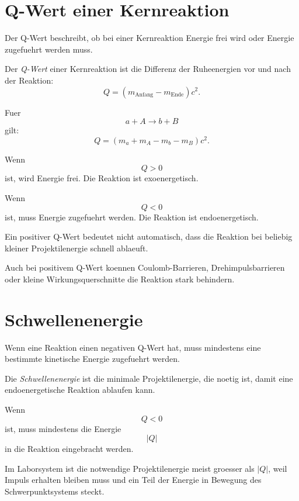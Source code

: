 \section{Q-Wert einer Kernreaktion}

Der Q-Wert beschreibt, ob bei einer Kernreaktion Energie frei wird oder Energie
zugefuehrt werden muss.

\begin{definitionbox}
Der \emph{Q-Wert} einer Kernreaktion ist die Differenz der Ruheenergien vor und
nach der Reaktion:
\[
    Q =
    \left(
        m_{\mathrm{Anfang}} - m_{\mathrm{Ende}}
    \right)c^2.
\]
\end{definitionbox}

\begin{formulabox}
Fuer
\[
    a + A \rightarrow b + B
\]
gilt:
\[
    Q =
    \left(
        m_a + m_A - m_b - m_B
    \right)c^2.
\]
\end{formulabox}

\begin{conceptbox}
Wenn
\[
    Q>0
\]
ist, wird Energie frei.
Die Reaktion ist exoenergetisch.

Wenn
\[
    Q<0
\]
ist, muss Energie zugefuehrt werden.
Die Reaktion ist endoenergetisch.
\end{conceptbox}

\begin{examtipbox}
Ein positiver Q-Wert bedeutet nicht automatisch, dass die Reaktion bei beliebig
kleiner Projektilenergie schnell ablaeuft.

Auch bei positivem Q-Wert koennen Coulomb-Barrieren, Drehimpulsbarrieren oder kleine
Wirkungsquerschnitte die Reaktion stark behindern.
\end{examtipbox}

\section{Schwellenenergie}

Wenn eine Reaktion einen negativen Q-Wert hat, muss mindestens eine bestimmte
kinetische Energie zugefuehrt werden.

\begin{definitionbox}
Die \emph{Schwellenenergie} ist die minimale Projektilenergie, die noetig ist,
damit eine endoenergetische Reaktion ablaufen kann.
\end{definitionbox}

\begin{conceptbox}
Wenn
\[
    Q<0
\]
ist, muss mindestens die Energie
\[
    |Q|
\]
in die Reaktion eingebracht werden.

Im Laborsystem ist die notwendige Projektilenergie meist groesser als $|Q|$,
weil Impuls erhalten bleiben muss und ein Teil der Energie in Bewegung des
Schwerpunktsystems steckt.
\end{conceptbox}

